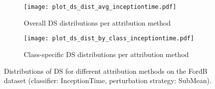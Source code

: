 \begin{figure}[!htbp]
    \centering
    \begin{subfigure}[b]{\textwidth}
        \centering
        \texttt{[image: plot\_ds\_dist\_avg\_inceptiontime.pdf]}
        \caption{Overall DS distributions per attribution method}
        \label{fig:ds_distributions_a}
    \end{subfigure}
    \vspace{0.8em}
    \begin{subfigure}[b]{\textwidth}
        \centering
        \texttt{[image: plot\_ds\_dist\_by\_class\_inceptiontime.pdf]}
        \caption{Class-specific DS distributions per attribution method}
        \label{fig:ds_distributions_b}
    \end{subfigure}
    \caption{Distributions of DS for different attribution methods on the FordB dataset (classifier: InceptionTime, perturbation strategy: SubMean).}
    \label{fig:ds_distributions}
\end{figure}